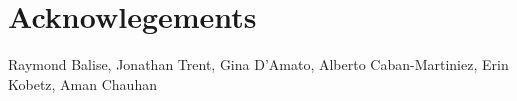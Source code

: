 \section{Acknowlegements}\label{acknowlegements}

Raymond Balise, Jonathan Trent, Gina D'Amato, Alberto Caban-Martiniez, Erin Kobetz, Aman Chauhan



\address{%
Brandon Rose\\
University of Texas Southwestern Medical Center\\%
Hematology/Oncology Department\\ Dallas, TX, USA\\
%
\url{https://www.thecodingdocs.com/}\\%
\textit{ORCiD: \href{https://orcid.org/0009-0009-7813-1960}{0009-0009-7813-1960}}\\%
\href{mailto:TheCodingDocs@gmail.com}{\nolinkurl{TheCodingDocs@gmail.com}}%
}

\address{%
Natalie Goulett\\
\\%
\\
%
%
\textit{ORCiD: \href{https://orcid.org/0009-0002-0961-9665}{0009-0002-0961-9665}}\\%
\href{mailto:nataliegoulett@gmail.com}{\nolinkurl{nataliegoulett@gmail.com}}%
}
